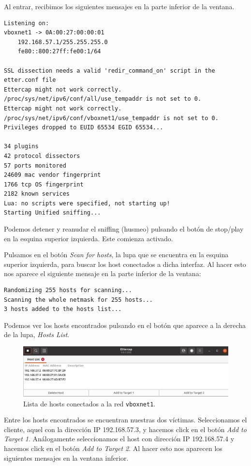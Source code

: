 \documentclass[11pt]{article}
\begin{document}
Al entrar, recibimos los siguientes mensajes en la parte inferior de la ventana.

\begin{Verbatim}[tabsize=4]
Listening on:
vboxnet1 -> 0A:00:27:00:00:01
	192.168.57.1/255.255.255.0
	fe80::800:27ff:fe00:1/64

SSL dissection needs a valid 'redir_command_on' script in the etter.conf file
Ettercap might not work correctly. /proc/sys/net/ipv6/conf/all/use_tempaddr is not set to 0.
Ettercap might not work correctly. /proc/sys/net/ipv6/conf/vboxnet1/use_tempaddr is not set to 0.
Privileges dropped to EUID 65534 EGID 65534...

34 plugins
42 protocol dissectors
57 ports monitored
24609 mac vendor fingerprint
1766 tcp OS fingerprint
2182 known services
Lua: no scripts were specified, not starting up!
Starting Unified sniffing...
\end{Verbatim}

Podemos detener y reanudar el sniffing (husmeo) pulsando el botón de stop/play en la esquina
 superior izquierda. Este comienza activado.
 
Pulsamos en el botón \textit{Scan for hosts}, la lupa que se encuentra en la esquina superior izquierda, para buscar los host conectados a dicha interfaz. Al hacer esto nos aparece el siguiente mensaje en la parte inferior de la ventana:

\begin{Verbatim}[tabsize=4]
Randomizing 255 hosts for scanning...
Scanning the whole netmask for 255 hosts...
3 hosts added to the hosts list...
\end{Verbatim}

Podemos ver los hosts encontrados pulsando en el botón que aparece a la derecha de la lupa, \textit{Hosts List}.

\begin{figure}[H]
	\centering
	\includegraphics[width=140mm]{images/host-list}
	\caption{Lista de hosts conectados a la red \texttt{vboxnet1}.}
	\label{fig:host-list}
\end{figure}


Entre los hosts encontrados se encuentran nuestras dos víctimas. Seleccionamos el cliente, aquel con la dirección IP 192.168.57.3, y hacemos click en el botón \textit{Add to Target 1}. Análogamente seleccionamos el host con dirección IP 192.168.57.4 y hacemos click en el botón \textit{Add to Target 2}. Al hacer esto nos aparecen los siguientes mensajes en la ventana inferior.
\end{document}
